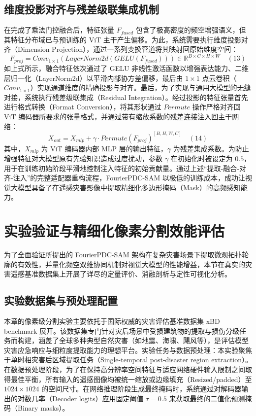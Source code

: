 \subsection{维度投影对齐与残差级联集成机制}
在完成了乘法门控融合后，特征张量 $F_{fused}$ 包含了极高密度的频空增强语义，但其特征分布域已与预训练的 ViT 主干产生偏移。为此，系统需要执行维度投影对齐（Dimension Projection），通过一系列变换管道将其映射回原始维度空间：$$F_{proj} = Conv_{1\times 1}(LayerNorm2d(GELU(F_{fused}))) \in \mathbb{R}^{B \times C \times H \times W} \quad (13)$$如上式所示，融合特征依次通过了 GELU 非线性激活函数以增强表达能力、二维层归一化（LayerNorm2d）以平滑内部协方差偏移，最后由 $1\times 1$ 点云卷积（$Conv_{1\times 1}$）实现通道维度的精确投影与对齐。最后，为了实现与通用大模型的无缝对接，系统执行残差级联集成（Residual Integration）。经过投影的特征张量首先进行格式转换（Format Conversion），将其形状通过 $Permute$ 操作严格对齐回 ViT 编码器所要求的张量格式，并通过带有缩放系数的残差连接注入回主干网络：$$X_{out} = X_{mlp} + \gamma \cdot Permute(F_{proj})^{[B,H,W,C]} \quad (14)$$其中，$X_{mlp}$ 为 ViT 编码器内部 MLP 层的输出特征，$\gamma$ 为残差集成系数。为防止增强特征对大模型原有先验知识造成过度扰动，参数 $\gamma$ 在初始化时被设定为 $0.5$，用于在训练初始阶段平滑地控制注入特征的初始贡献量。通过上述“提取-融合-对齐-注入”的完整适配器重构流程，FourierPDC-SAM 以极低的训练成本，成功让视觉大模型具备了在遥感灾害影像中提取精细化多边形掩码（Mask）的高频感知能力。

\section{实验验证与精细化像素分割效能评估}
为了全面验证所提出的 FourierPDC-SAM 架构在复杂灾害场景下提取微观拓扑轮廓的有效性，并量化频空双维协同机制对视觉大模型的性能增益，本节在真实的灾害遥感基准数据集上开展了详尽的定量评价、消融剖析与定性可视化分析。

\subsection{实验数据集与预处理配置}
本章的像素级分割实验主要依托于国际权威的灾害评估基准数据集 xBD benchmark 展开。该数据集专门针对灾后场景中受损建筑物的提取与损伤分级任务而构建，涵盖了全球多种典型自然灾害（如地震、海啸、飓风等），是评估模型灾害应急响应与细粒度提取能力的理想平台。实验任务与数据预处理：本实验聚焦于单时相灾害后区域提取任务（Single-temporal post-disaster region extraction）。在数据预处理阶段，为了在保持高分辨率空间特征与适应网络硬件输入限制之间取得最佳平衡，所有输入的遥感图像均被统一缩放或边缘填充（Resized/padded）至 $1024 \times 1024$ 的空间尺寸。在网络推理阶段生成最终掩码时，系统通过对解码器输出的对数几率（Decoder logits）应用固定阈值 $\tau=0.5$ 来获取最终的二值化预测掩码（Binary masks）。


